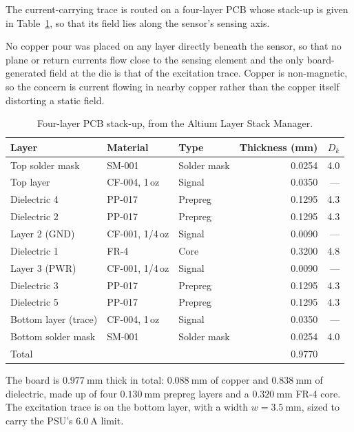 \documentclass[12pt,a4paper]{article}
\begin{document}
The current-carrying trace is routed on a four-layer PCB whose stack-up is given in Table~\ref{tab:stackup}, so that its field lies along the sensor's sensing axis.

No copper pour was placed on any layer directly beneath the sensor, so that no plane or return currents flow close to the sensing element and the only board-generated field at the die is that of the excitation trace. Copper is non-magnetic, so the concern is current flowing in nearby copper rather than the copper itself distorting a static field.

\begin{table}[H]
\centering
\caption{Four-layer PCB stack-up, from the Altium Layer Stack Manager.}
\label{tab:stackup}
\begin{tabular}{@{}lllrr@{}}
\toprule
Layer & Material & Type & Thickness (mm) & $D_k$ \\
\midrule
Top solder mask & SM-001 & Solder mask & 0.0254 & 4.0 \\
Top layer & CF-004, 1\,oz & Signal & 0.0350 & --- \\
Dielectric 4 & PP-017 & Prepreg & 0.1295 & 4.3 \\
Dielectric 2 & PP-017 & Prepreg & 0.1295 & 4.3 \\
Layer 2 (GND) & CF-001, 1/4\,oz & Signal & 0.0090 & --- \\
Dielectric 1 & FR-4 & Core & 0.3200 & 4.8 \\
Layer 3 (PWR) & CF-001, 1/4\,oz & Signal & 0.0090 & --- \\
Dielectric 3 & PP-017 & Prepreg & 0.1295 & 4.3 \\
Dielectric 5 & PP-017 & Prepreg & 0.1295 & 4.3 \\
Bottom layer (trace) & CF-004, 1\,oz & Signal & 0.0350 & --- \\
Bottom solder mask & SM-001 & Solder mask & 0.0254 & 4.0 \\
\midrule
Total & & & 0.9770 & \\
\bottomrule
\end{tabular}
\end{table}
 
The board is $\SI{0.977}{\milli\metre}$ thick in total: $\SI{0.088}{\milli\metre}$ of copper and $\SI{0.838}{\milli\metre}$ of dielectric, made up of four $\SI{0.130}{\milli\metre}$ prepreg layers and a $\SI{0.320}{\milli\metre}$ FR-4 core. The excitation trace is on the bottom layer, with a width $w = \SI{3.5}{\milli\metre}$, sized to carry the PSU's $\SI{6.0}{\ampere}$ limit.
\end{document}
